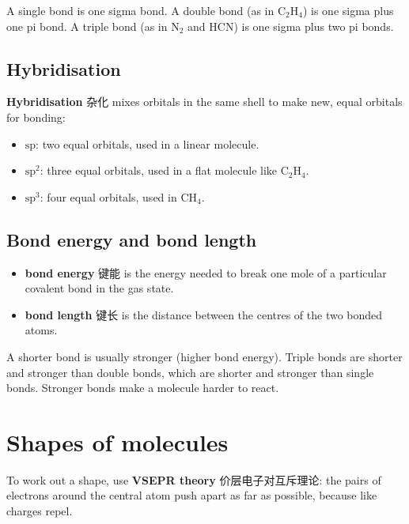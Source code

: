 \documentclass[11pt]{article}
\begin{document}
A single bond is one sigma bond. A double bond (as in $\text{C}_2\text{H}_4$) is one sigma plus one pi bond. A triple bond (as in $\text{N}_2$ and $\text{HCN}$) is one sigma plus two pi bonds.

\subsection*{Hybridisation}

\textbf{Hybridisation} 杂化 mixes orbitals in the same shell to make new, equal orbitals for bonding:

\begin{itemize}
\item $\text{sp}$: two equal orbitals, used in a linear molecule.

\item $\text{sp}^2$: three equal orbitals, used in a flat molecule like $\text{C}_2\text{H}_4$.

\item $\text{sp}^3$: four equal orbitals, used in $\text{CH}_4$.

\end{itemize}

\subsection*{Bond energy and bond length}

\begin{itemize}
\item \textbf{bond energy} 键能 is the energy needed to break one mole of a particular covalent bond in the gas state.

\item \textbf{bond length} 键长 is the distance between the centres of the two bonded atoms.

\end{itemize}

A shorter bond is usually stronger (higher bond energy). Triple bonds are shorter and stronger than double bonds, which are shorter and stronger than single bonds. Stronger bonds make a molecule harder to react.

\section*{Shapes of molecules}

To work out a shape, use \textbf{VSEPR theory} 价层电子对互斥理论: the pairs of electrons around the central atom push apart as far as possible, because like charges repel.
\end{document}
